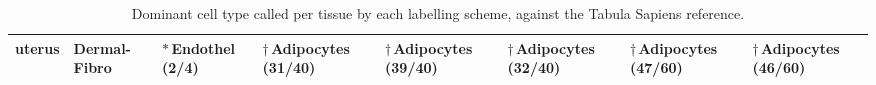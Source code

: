 \begin{table}[t]
{\begin{tabular}{llllllll}
uterus & Dermal-Fibro & \cellcolor{blue!12}$\ast$\,Endothel (2/4) & \cellcolor{magenta!15}$\dagger$\,Adipocytes (31/40) & \cellcolor{magenta!15}$\dagger$\,Adipocytes (39/40) & \cellcolor{magenta!15}$\dagger$\,Adipocytes (32/40) & \cellcolor{magenta!15}$\dagger$\,Adipocytes (47/60) & \cellcolor{magenta!15}$\dagger$\,Adipocytes (46/60) \\
\bottomrule
\end{tabular}
}
\par{}
\caption{Dominant cell type called per tissue by each labelling scheme, against the Tabula Sapiens reference.}
\label{tab:dominance}
\end{table}